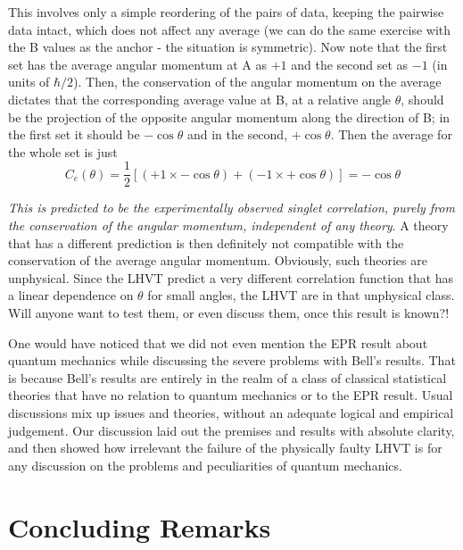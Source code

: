 This involves only a simple reordering of the pairs of data, keeping the pairwise data intact, which does not affect any average (we can do the same exercise with the B values as the anchor - the situation is symmetric). Now note that the first set has the average angular
momentum at A as $+1$ and the second set as $-1$ (in units of $\hbar/2$). Then, the conservation
of the angular momentum on the average dictates that the corresponding average value at
B, at a relative angle $\theta$, should be the projection of the opposite angular momentum along
the direction of B; in the first set it should be $- \cos \theta$ and in the second, $+ \cos \theta$. Then the
average for the whole set is just
\begin{equation*}
C_e(\theta) = \frac{1}{2}\left[(+1 \times -\cos \theta) + (-1 \times + \cos \theta )\right]  = -\cos\theta \tag{42}\label{c14-eq42}
\end{equation*}

\textit{This is predicted to be the experimentally observed singlet correlation, purely from the
conservation of the angular momentum, independent of any theory}. A theory that has a
different prediction is then definitely not compatible with the conservation of the average
angular momentum. Obviously, such theories are unphysical. Since the LHVT predict a
very different correlation function that has a linear dependence on $\theta$ for small angles, the
LHVT are in that unphysical class. Will anyone want to test them, or even discuss them,
once this result is known?!

One would have noticed that we did not even mention the EPR result about quantum
mechanics while discussing the severe problems with Bell's results. That is because Bell's
results are entirely in the realm of a class of classical statistical theories that have no relation
to quantum mechanics or to the EPR result. Usual discussions mix up issues and theories,
without an adequate logical and empirical judgement. Our discussion laid out the premises
and results with absolute clarity, and then showed how irrelevant the failure of the physically
faulty LHVT is for any discussion on the problems and peculiarities of quantum mechanics.

\section{Concluding Remarks}\label{c14-sec10}

